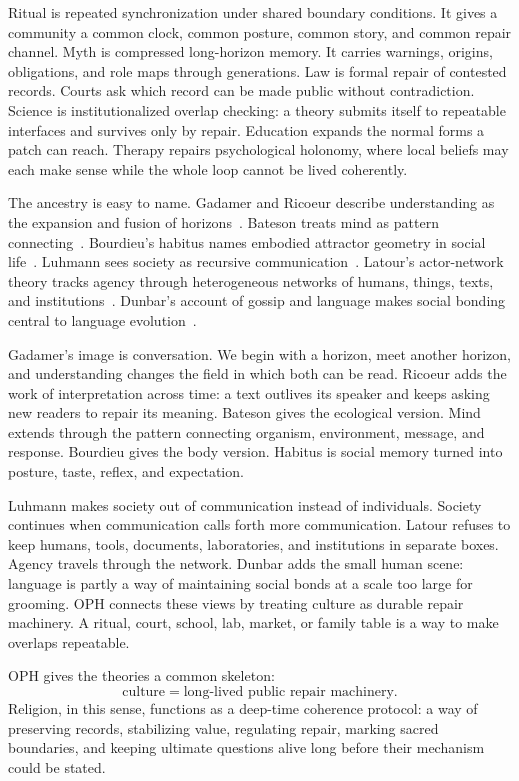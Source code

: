\documentclass[11pt]{article}
\theoremstyle{remark}
\theoremstyle{plain}
\begin{document}
Ritual is repeated synchronization under shared boundary conditions. It gives a
community a common clock, common posture, common story, and common repair
channel. Myth is compressed long-horizon memory. It carries warnings, origins,
obligations, and role maps through generations. Law is formal repair of
contested records. Courts ask which record can be made public without
contradiction. Science is institutionalized overlap checking: a theory submits
itself to repeatable interfaces and survives only by repair. Education expands
the normal forms a patch can reach. Therapy repairs psychological holonomy,
where local beliefs may each make sense while the whole loop cannot be lived
coherently.

The ancestry is easy to name. Gadamer and Ricoeur describe
understanding as the expansion and fusion of horizons~\cite{Gadamer1960,Ricoeur1984}.
Bateson treats mind as pattern connecting~\cite{Bateson1972}. Bourdieu's
habitus names embodied attractor geometry in social life~\cite{Bourdieu1977}.
Luhmann sees society as recursive communication~\cite{Luhmann1995}. Latour's
actor-network theory tracks agency through heterogeneous networks of humans,
things, texts, and institutions~\cite{Latour2005}. Dunbar's account of gossip
and language makes social bonding central to language evolution~\cite{Dunbar1996}.

Gadamer's image is conversation. We begin with a horizon, meet another horizon,
and understanding changes the field in which both can be read. Ricoeur adds the
work of interpretation across time: a text outlives its speaker and keeps asking
new readers to repair its meaning. Bateson gives the ecological version. Mind
extends through the pattern connecting organism, environment, message, and
response. Bourdieu gives the body version. Habitus is social memory
turned into posture, taste, reflex, and expectation.

Luhmann makes society out of communication instead of individuals. Society
continues when communication calls forth more communication. Latour refuses to
keep humans, tools, documents, laboratories, and institutions in separate boxes.
Agency travels through the network. Dunbar adds the small human scene: language
is partly a way of maintaining social bonds at a scale too large for grooming.
OPH connects these views by treating culture as durable repair machinery. A
ritual, court, school, lab, market, or family table is a way to make overlaps
repeatable.

OPH gives the theories a common skeleton:
\[
\boxed{
\text{culture}=\text{long-lived public repair machinery}.
}
\]
Religion, in this sense, functions as a deep-time coherence protocol: a way of
preserving records, stabilizing value, regulating repair, marking sacred
boundaries, and keeping ultimate questions alive long before their mechanism
could be stated.
\end{document}
